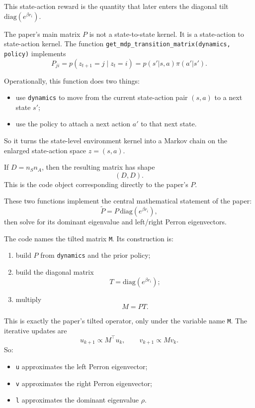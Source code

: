 \documentclass[11pt]{article}
\begin{document}
This state-action reward is the quantity that later enters the diagonal tilt
\(\mathrm{diag}(e^{\beta r_i})\).

The paper's main matrix \(P\) is not a state-to-state kernel. It is a state-action to
state-action kernel. The function \texttt{get\_mdp\_transition\_matrix(dynamics, policy)}
implements
\begin{equation}
    P_{ji} = p(z_{t+1}=j \mid z_t=i)
    = p(s'|s,a)\pi(a'|s').
\end{equation}

Operationally, this function does two things:
\begin{itemize}
    \item use \texttt{dynamics} to move from the current state-action pair \((s,a)\) to a next
    state \(s'\);
    \item use the policy to attach a next action \(a'\) to that next state.
\end{itemize}
So it turns the state-level environment kernel into a Markov chain on the enlarged
state-action space \(z=(s,a)\).

If \(D=n_S n_A\), then the resulting matrix has shape
\begin{equation}
    (D,D).
\end{equation}
This is the code object corresponding directly to the paper's \(P\).

These two functions implement the central mathematical statement of the paper:
\begin{equation}
    \widetilde{P} = P \, \mathrm{diag}(e^{\beta r_i}),
\end{equation}
then solve for its dominant eigenvalue and left/right Perron eigenvectors.

The code names the tilted matrix \texttt{M}. Its construction is:
\begin{enumerate}
    \item build \(P\) from \texttt{dynamics} and the prior policy;
    \item build the diagonal matrix
    \begin{equation}
        T = \mathrm{diag}(e^{\beta r_i});
    \end{equation}
    \item multiply
    \begin{equation}
        M = P T.
    \end{equation}
\end{enumerate}

This is exactly the paper's tilted operator, only under the variable name \texttt{M}.
The iterative updates are
\begin{equation}
    u_{k+1} \propto M^\top u_k,
    \qquad
    v_{k+1} \propto M v_k.
\end{equation}
So:
\begin{itemize}
    \item \texttt{u} approximates the left Perron eigenvector;
    \item \texttt{v} approximates the right Perron eigenvector;
    \item \texttt{l} approximates the dominant eigenvalue \(\rho\).
\end{itemize}
\end{document}
